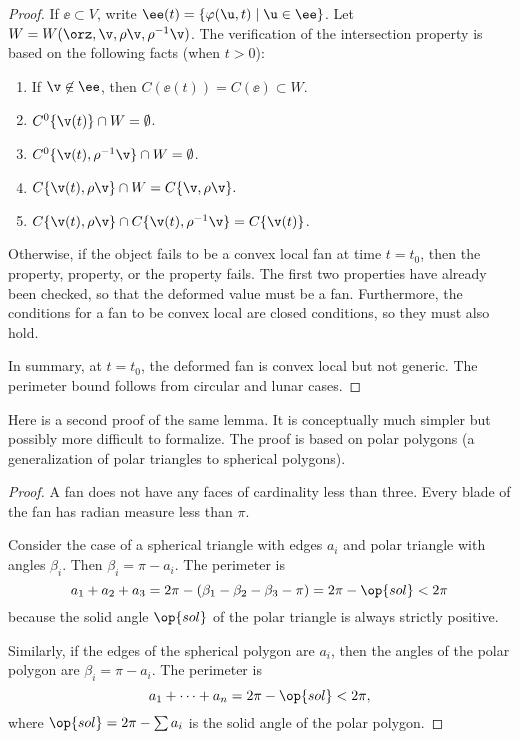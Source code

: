 \begin{proof}
  If $\ee\subset V$,
write $\ee(t) = \{\varphi(\u,t) \mid \u\in \ee\}$.  Let $W
=W(\orz,\v,\rho\v,\rho^{-1}\v)$. The verification of the intersection
property is based on the following facts (when $t>0$):
\begin{enumerate}\wasitemize  
\item If $\v\not\in \ee$, then $C(\ee(t))=C(\ee)\subset W$.
\item $C^0\{\v(t)\} \cap W = \emptyset$.
\item $C^0\{\v(t),\rho^{-1}\v\}\cap W = \emptyset$.
\item $C\{\v(t),\rho\v\}\cap W = C\{\v,\rho\v\}.$
\item $C\{\v(t),\rho\v\}\cap C\{\v(t),\rho^{-1}\v\} = C\{\v(t)\}$.
\end{enumerate}\wasitemize 

Otherwise, if the object fails to be a convex local fan at time
$t=t_0$, then the  property, 
property, or the  property fails.  The first two
properties have already been checked, so that the deformed value must
be a fan.  Furthermore, the conditions for a fan to be convex local
are closed conditions, so they must also hold.

In summary, at $t=t_0$, the deformed fan is convex local but not
generic.  The perimeter bound follows from circular and lunar cases.
\end{proof}

Here is a second proof of the same lemma.  It is conceptually much
simpler but possibly more difficult to formalize.  The proof is based
on polar polygons (a generalization of polar triangles to spherical
polygons).

\begin{proof} A fan does not have any faces of cardinality less than
three.  Every blade of the fan has radian measure less than $\pi$.
%

Consider the case of a spherical triangle with edges $a_i$
and polar triangle with angles $\beta_i$. Then $\beta_i=\pi-a_i$.
The perimeter is 
\[ a_1+a_2+a_3 = 2\pi - (\beta_1 -\beta_2 -
\beta_3-\pi)= 2\pi-\op{sol} < 2\pi\]  because the
solid angle $\op{sol}$ of the polar triangle is always strictly
positive.  %

Similarly, if the edges of the spherical polygon are
$a_i$, then the angles of the polar polygon are $\beta_i = \pi-a_i$.
The perimeter is
\[ 
a_1+\cdots+a_n  = 2\pi- \op{sol}< 2\pi,
\] 
where $\op{sol} = 2\pi-\sum a_i$ is the solid angle of the polar polygon.
%
\end{proof}


